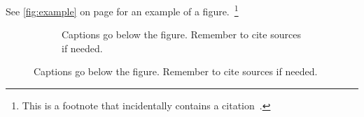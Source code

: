 See \autoref{fig:example} on page \pageref{fig:example} for an example of a
figure.~\footnote{This is a footnote that incidentally contains a
citation~\cite{5377665}.}
%
\begin{figure}[!ht]
  \begin{subfigure}[b]{\textwidth}
%
%
%
%
    \caption{Captions go below the figure. Remember to cite sources if needed.}
    \label{fig:example:a}
  \end{subfigure}


\end{figure}
